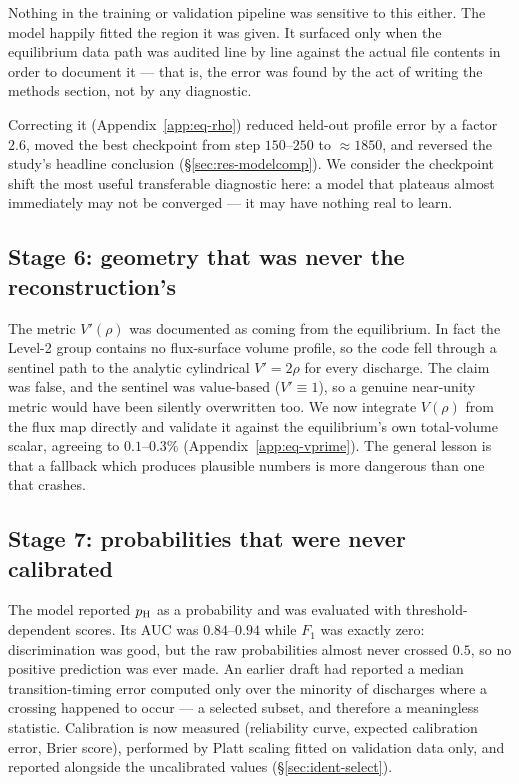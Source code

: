 Nothing in the training or validation pipeline was sensitive to this either.
The model happily fitted the region it was given. It surfaced only when the
equilibrium data path was audited line by line against the actual file
contents in order to document it --- that is, the error was found by the act
of writing the methods section, not by any diagnostic.

Correcting it (Appendix~\ref{app:eq-rho}) reduced held-out profile error by
a factor $2.6$, moved the best checkpoint from step $150$--$250$ to
$\approx 1850$, and reversed the study's headline conclusion
(\S\ref{sec:res-modelcomp}). We consider the checkpoint shift the most
useful transferable diagnostic here: a model that plateaus almost
immediately may not be converged --- it may have nothing real to learn.

\subsection{Stage 6: geometry that was never the reconstruction's}
\label{app:hist-vprime}

The metric $V'(\rho)$ was documented as coming from the equilibrium. In fact
the Level-2 group contains no flux-surface volume profile, so the code fell
through a sentinel path to the analytic cylindrical $V' = 2\rho$ for every
discharge. The claim was false, and the sentinel was value-based
($V' \equiv 1$), so a genuine near-unity metric would have been silently
overwritten too. We now integrate $V(\rho)$ from the flux map directly and
validate it against the equilibrium's own total-volume scalar, agreeing to
$0.1$--$0.3\%$ (Appendix~\ref{app:eq-vprime}). The general lesson is that a
fallback which produces plausible numbers is more dangerous than one that
crashes.

\subsection{Stage 7: probabilities that were never calibrated}
\label{app:hist-calib}

The model reported $p_{\mathrm{H}}$ as a probability and was evaluated with
threshold-dependent scores. Its AUC was $0.84$--$0.94$ while $F_1$ was
exactly zero: discrimination was good, but the raw probabilities almost
never crossed $0.5$, so no positive prediction was ever made. An earlier
draft had reported a median transition-timing error computed only over the
minority of discharges where a crossing happened to occur --- a selected
subset, and therefore a meaningless statistic. Calibration is now measured
(reliability curve, expected calibration error, Brier score), performed by
Platt scaling fitted on validation data only, and reported alongside the
uncalibrated values (\S\ref{sec:ident-select}).


